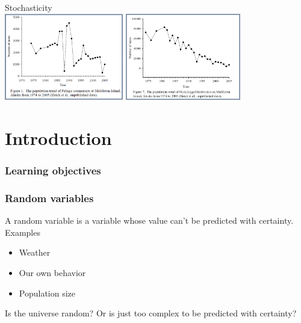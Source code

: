 \documentclass[color=usenames,dvipsnames]{beamer}\usepackage[]{graphicx}\usepackage[]{xcolor}
\begin{document}
\begin{frame}[plain]
  \begin{center}
    {\huge Stochasticity} \\
    \vfill
    \includegraphics[height=3.8cm,keepaspectratio]{figs/pelagic-cormorants} \hspace{0.1cm}
    \includegraphics[height=3.8cm,keepaspectratio]{figs/kittiwakes} %
  \end{center}
\end{frame}




\section{Introduction}


\begin{frame}[plain]
  \frametitle{Learning objectives}
  \tableofcontents%
\end{frame}




\begin{frame}
  \frametitle{Random variables}
  \large
  A random variable is a variable whose value can't be predicted
  with certainty. \\
  \pause
  \vfill
  Examples
  \begin{itemize}
    \item Weather
    \item Our own behavior
    \item Population size
  \end{itemize}
  \pause
  \vfill
  Is the universe random? Or is just too complex to be predicted with certainty? 
\end{frame}
\end{document}
